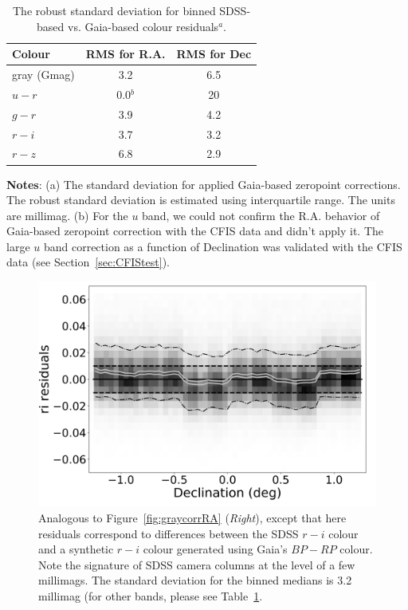 \documentclass[fleqn,usenatbib]{mnras}
\begin{document}
\begin{table}
	\centering
	\caption{The robust standard deviation for binned SDSS-based vs. Gaia-based colour residuals$^a$. }
	\label{tab:GaiaRMS}

	\begin{tabular}{l|c|c} %
		\hline
		Colour & RMS for R.A. & RMS for Dec \\
		\hline
 gray (Gmag) &    3.2         &    6.5   \\
    $u-r$        &   0.0$^b$  &   20    \\     
    $g-r$        &   3.9         &    4.2    \\
    $r-i$         &   3.7         &    3.2    \\ 
    $r-z$        &   6.8         &    2.9    \\ 
		\hline
	\end{tabular}
     \vspace{1ex}

     {\raggedright {\bf Notes}: (a) The standard deviation for applied Gaia-based zeropoint corrections. The robust standard deviation is estimated using interquartile range. The units are millimag. \newline (b) For the $u$ band, we could not confirm the R.A. behavior of Gaia-based zeropoint correction with the CFIS data and didn't apply it. The large $u$ band correction as a function of Declination was validated with the CFIS data (see Section~\ref{sec:CFIStest}). \par}
\end{table}

 

\begin{figure}
    \centering\includegraphics[width=0.9\columnwidth]{figures/colorResidGaiaColorsB_ri_Dec_Hess.png} 
\caption{Analogous to Figure~\ref{fig:graycorrRA} ({\it Right}), except that here residuals 
correspond to differences between the SDSS $r-i$ colour and a synthetic $r-i$ colour
generated using Gaia's $BP-RP$ colour. Note the signature of SDSS camera columns
at the level of a few millimags. The standard deviation for the binned medians is 
3.2 millimag (for other bands, please see Table~\ref{tab:GaiaRMS}.}
\label{fig:riresid}
\end{figure}
\end{document}
